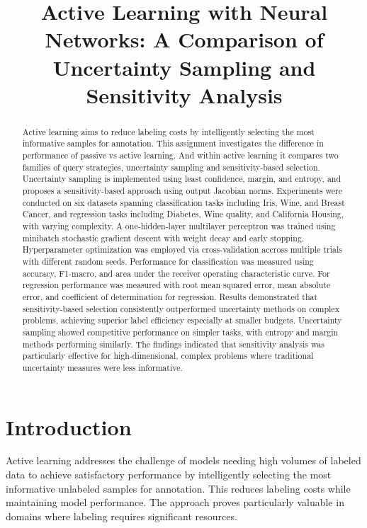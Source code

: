 \documentclass[conference]{IEEEtran}
\title{Active Learning with Neural Networks: A Comparison of Uncertainty Sampling and Sensitivity Analysis}
\author{\IEEEauthorblockN{\nameinit\ \surname\ \, (\studentnumber)}
\IEEEauthorblockA{Stellenbosch University\\ Machine Learning 441\\ \emailaddr}}
\begin{document}
\maketitle

\begin{abstract}
Active learning aims to reduce labeling costs by intelligently selecting the most informative samples for annotation. This assignment investigates the difference in performance of passive vs active learning. And within active learning it compares two families of query strategies, uncertainty sampling and sensitivity-based selection. Uncertainty sampling is implemented using least confidence, margin, and entropy, and proposes a sensitivity-based approach using output Jacobian norms. Experiments were conducted on six datasets spanning classification tasks including Iris, Wine, and Breast Cancer, and regression tasks including Diabetes, Wine quality, and California Housing, with varying complexity. A one-hidden-layer multilayer perceptron was trained using minibatch stochastic gradient descent with weight decay and early stopping. Hyperparameter optimization was employed via cross-validation accross multiple trials with different random seeds. Performance for classification was measured using accuracy, F1-macro, and area under the receiver operating characteristic curve. For regression performance was measured with root mean squared error, mean absolute error, and coefficient of determination for regression. Results demonstrated that sensitivity-based selection consistently outperformed uncertainty methods on complex problems, achieving superior label efficiency especially at smaller budgets. Uncertainty sampling showed competitive performance on simpler tasks, with entropy and margin methods performing similarly. The findings indicated that sensitivity analysis was particularly effective for high-dimensional, complex problems where traditional uncertainty measures were less informative.
\end{abstract}

\section{Introduction}

Active learning addresses the challenge of models needing high volumes of labeled data to achieve satisfactory performance by intelligently selecting the most informative unlabeled samples for annotation. This reduces labeling costs while maintaining model performance. The approach proves particularly valuable in domains where labeling requires significant resources.
\end{document}
